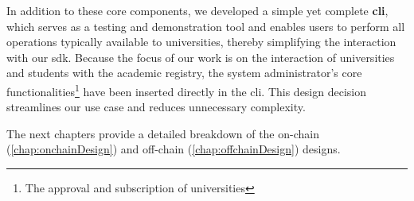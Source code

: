 In addition to these core components, we developed a simple yet complete \textbf{\gls{cli}}, which serves as a testing and demonstration tool and enables users to perform all operations typically available to universities, thereby simplifying the interaction with our \gls{sdk}. Because the focus of our work is on the interaction of universities and students with the academic registry, the system administrator's core functionalities\footnote{The approval and subscription of universities} have been inserted directly in the \gls{cli}. This design decision streamlines our use case and reduces unnecessary complexity.

The next chapters provide a detailed breakdown of the on-chain (\cref{chap:onchainDesign}) and off-chain (\cref{chap:offchainDesign}) designs.